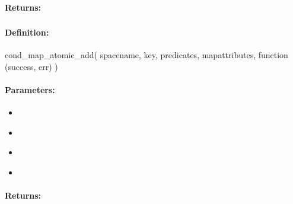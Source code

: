 \paragraph{Returns:}


\pagebreak
\subsubsection{}
\label{api:nodejs:cond_map_atomic_add}


\paragraph{Definition:}
\begin{javascriptcode}
cond_map_atomic_add(
        spacename, key, predicates, mapattributes, function (success, err) {})
\end{javascriptcode}
\paragraph{Parameters:}
\begin{itemize}[noitemsep]
\item {}\\

\item {}\\

\item {}\\

\item {}\\

\end{itemize}

\paragraph{Returns:}


\pagebreak
\subsubsection{}
\label{api:nodejs:group_map_atomic_add}


